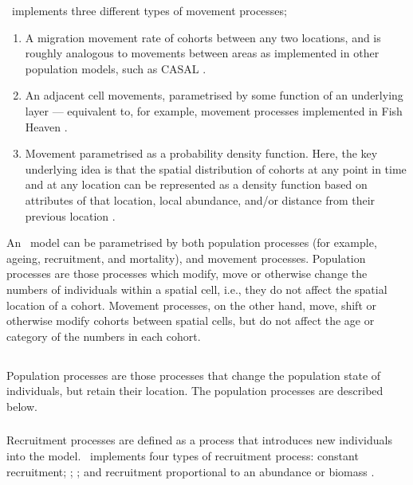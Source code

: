 \SPM\ implements three different types of movement processes;
\begin{enumerate}
	\item  A migration movement rate of cohorts between any two locations, and is roughly analogous to movements between areas as implemented in other population models, such as CASAL \citep{1388}. 
	\item An adjacent cell movements, parametrised by some function of an underlying layer --- equivalent to, for example, movement processes implemented in Fish Heaven \citep{1136,1135}. 
	\item Movement parametrised as a probability density function. Here, the key underlying idea is that the spatial distribution of cohorts at any point in time and at any location can be represented as a density function based on attributes of that location, local abundance, and/or distance from their previous location \citep{1366,1367}. 
\end{enumerate}

An \SPM\ model can be parametrised by both population processes (for example, ageing, recruitment, and mortality), and movement processes. Population processes are those processes which modify, move or otherwise change the numbers of individuals within a spatial cell, i.e., they do not affect the spatial location of a cohort. Movement processes, on the other hand, move, shift or otherwise modify cohorts between spatial cells, but do not affect the age or category of the numbers in each cohort. 

\subsection{}

Population processes are those processes that change the population state of individuals, but retain their location. The population processes are described below.

\subsubsection{}

Recruitment processes are defined as a process that introduces new individuals into the model. \SPM\ implements four types of recruitment process: constant recruitment;   \citep{1203}; ; and recruitment proportional to an abundance or biomass .

